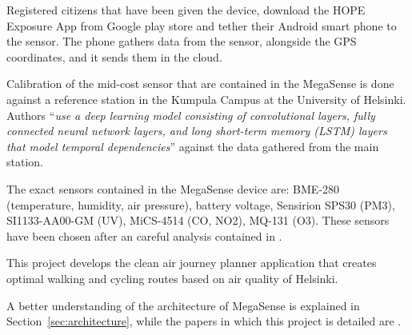 			Registered citizens that have been given the device, download the HOPE Exposure App from Google play store and tether their Android smart phone to the sensor.
			The phone gathers data from the sensor, alongside the GPS coordinates, and it sends them in the cloud.

			Calibration of the mid-cost sensor that are contained in the MegaSense is done against a reference station in the Kumpula Campus at the University of Helsinki.
			Authors ``\textit{use a deep learning model consisting of convolutional layers, fully connected neural network layers, and long short-term memory (LSTM) layers that model temporal dependencies}'' \cite{8999428} against the data gathered from the main station.
			
			The exact sensors \cite{megasense} contained in the MegaSense device are: BME-280 (temperature, humidity, air pressure), battery voltage, Sensirion SPS30 (PM3), SI1133-AA00-GM (UV), MiCS-4514 (CO, NO2), MQ-131 (O3).
			These sensors have been chosen after an careful analysis contained in \cite{unknown}.
						
			This project develops the clean air journey	planner application that creates optimal walking and cycling routes based on air quality of Helsinki.
			
			A better understanding of the architecture of MegaSense is explained in Section~\ref{sec:architecture}, while the papers in which this project is detailed are \cite{8999428, megasense}.